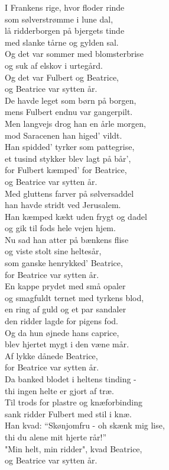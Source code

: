 I Frankens rige, hvor floder rinde\\
som sølverstrømme i lune dal,\\
lå ridderborgen på bjergets tinde\\
med slanke tårne og gylden sal.\\
Og det var sommer med blomsterbrise\\
og suk af elskov i urtegård.\\
Og det var Fulbert og Beatrice,\\
og Beatrice var sytten år.\\


De havde leget som børn på borgen,\\
mens Fulbert endnu var gangerpilt.\\
Men langvejs drog han en årle morgen,\\
mod Saracenen han higed' vildt.\\
Han spidded' tyrker som pattegrise,\\
et tusind stykker blev lagt på bår',\\
for Fulbert kæmped' for Beatrice,\\
og Beatrice var sytten år.\\


Med gluttens farver på sølversaddel\\
han havde stridt ved Jerusalem.\\
Han kæmped kækt uden frygt og dadel\\
og gik til fods hele vejen hjem.\\
Nu sad han atter på bænkens flise\\
og viste stolt sine heltesår,\\
som ganske henrykked' Beatrice,\\
for Beatrice var sytten år.\\

\newpage
En kappe prydet med små opaler\\
og smagfuldt ternet med tyrkens blod,\\
en ring af guld og et par sandaler\\
den ridder lagde for pigens fod.\\
Og da hun øjnede hans caprice,\\
blev hjertet mygt i den væne mår.\\
Af lykke dånede Beatrice,\\
for Beatrice var sytten år.\\


Da banked blodet i heltens tinding -\\
thi ingen helte er gjort af træ.\\
Til trods for plastre og knæforbinding\\
sank ridder Fulbert med stil i knæ.\\
Han kvad: ``Skønjomfru - oh skænk mig lise,\\
thi du alene mit hjerte rår!''\\
"Min helt, min ridder", kvad Beatrice,\\
og Beatrice var sytten år.\\


